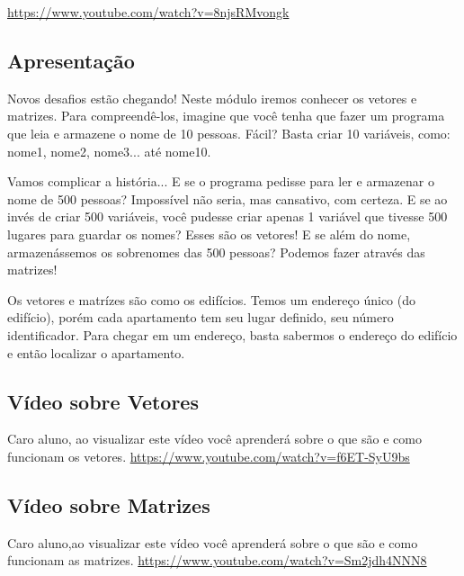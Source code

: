 \documentclass{article}
\begin{document}
\href{https://www.youtube.com/watch?v=8njsRMvongk}{https://www.youtube.com/watch?v=8njsRMvongk}

\subsection{Apresentação}
Novos desafios estão chegando! Neste módulo iremos conhecer os vetores e matrizes. Para compreendê-los, imagine que você tenha que fazer um programa que leia e armazene o nome de 10 pessoas. Fácil? Basta criar 10 variáveis, como: nome1, nome2, nome3... até nome10.

Vamos complicar a história... E se o programa pedisse para ler e armazenar o nome de 500 pessoas? Impossível não seria, mas cansativo, com certeza. E se ao invés de criar 500 variáveis, você pudesse criar apenas 1 variável que tivesse 500 lugares para guardar os nomes? Esses são os vetores! E se além do nome, armazenássemos os sobrenomes das 500 pessoas? Podemos fazer através das matrizes!

Os vetores e matrízes são como os edifícios. Temos um endereço único (do edifício), porém cada apartamento tem seu lugar definido, seu número identificador. Para chegar em um endereço, basta sabermos o endereço do edifício e então localizar o apartamento.

\subsection{Vídeo sobre Vetores}
Caro aluno, ao visualizar este vídeo você aprenderá sobre o que são e como funcionam os vetores.
\href{https://www.youtube.com/watch?v=f6ET-SyU9bs}{https://www.youtube.com/watch?v=f6ET-SyU9bs}

\subsection{Vídeo sobre Matrizes}
Caro aluno,ao visualizar este vídeo você aprenderá sobre o que são e como funcionam as matrizes.
\href{https://www.youtube.com/watch?v=Sm2jdh4NNN8}{https://www.youtube.com/watch?v=Sm2jdh4NNN8}
\end{document}
